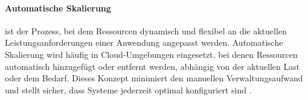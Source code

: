     \paragraph{Automatische Skalierung} ist der Prozess, bei dem Ressourcen dynamisch und flexibel an die aktuellen Leistungsanforderungen einer Anwendung angepasst werden. Automatische Skalierung wird häufig in Cloud-Umgebungen eingesetzt, bei denen Ressourcen automatisch hinzugefügt oder entfernt werden, abhängig von der aktuellen Last oder dem Bedarf. Dieses Konzept minimiert den manuellen Verwaltungsaufwand und stellt sicher, dass Systeme jederzeit optimal konfiguriert sind \cite{mic-autoscaling}.

